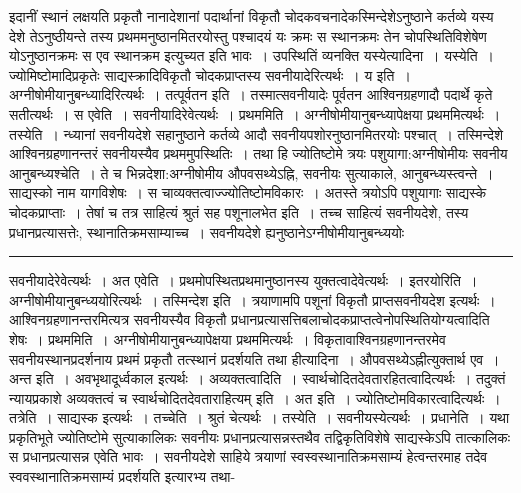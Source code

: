 \documentclass[11pt, openany]{book}
\begin{document}
 इदानीं स्थानं लक्षयति प्रकृतौ नानादेशानां पदार्थानां विकृतौ चोदकवचनादेकस्मिन्देशेऽनुष्ठाने कर्तव्ये यस्य देशे तेऽनुष्ठीयन्ते तस्य प्रथममनुष्ठानमितरयोस्तु पश्चादयं यः क्रमः स स्थानक्रमः तेन चोपस्थितिविशेषेण योऽनुष्ठानक्रमः स एव स्थानक्रम इत्युच्यत इति भावः~। उपस्थितिं व्यनक्ति {\br यस्येत्यादिना~। यस्येति~।} ज्योमिष्टोमादिप्रकृतेः साद्यस्क्रादिविकृतौ चोदकप्राप्तस्य सवनीयादेरित्यर्थः~। {\br य इति~।} अग्नीषोमीयानुबन्ध्यादिरित्यर्थः~। {\br तत्पूर्वतन इति~।} तस्मात्सवनीयादेः पूर्वतन आश्विनग्रहणादौ पदार्थे कृते सतीत्यर्थः~। {\br स एवेति~।} सवनीयादिरेवेत्यर्थः~। {\br प्रथममिति~।} अग्नीषोमीयानुबन्ध्यापेक्षया प्रथममित्यर्थः~। {\br तस्येति~।}
\newpage
\fancyhead[RE]{[ स्थान}
{\bl\noindent न्ध्यानां सवनीयदेशे सहानुष्ठाने कर्तव्ये आदौ सवनीयपशोरनुष्ठानमितरयोः पश्चात्~। तस्मिन्देशे आश्विनग्रहणानन्तरं सवनीयस्यैव प्रथममुपस्थितिः~। तथा
हि ज्योतिष्टोमे त्रयः पशुयागा:अग्नीषोमीयः सवनीय आनुबन्ध्यश्चेति~। ते च भिन्नदेशा:अग्नीषोमीय औपवसथ्येऽह्नि, सवनीयः सुत्याकाले, आनुबन्ध्यस्त्वन्ते~। साद्यस्को नाम याग\footnotemarkA[1]विशेषः~। स चाव्यक्तत्वाज्ज्योतिष्टोमविकारः~। अतस्ते त्रयोऽपि पशुयागाः साद्यस्के चोदकप्राप्ताः~। तेषां च तत्र साहित्यं श्रुतं {\qtl सह पशूनालभेत} इति~। तच्च साहित्यं सवनीयदेशे, तस्य प्रधानप्रत्यासत्तेः, स्थानातिक्रमसाम्याच्च~। सवनीयदेशे ह्यनुष्ठानेऽग्नीषोमीयानुबन्ध्ययोः \\}
\hrule
\vspace{3mm}
\noindent
सवनीयादेरेवेत्यर्थः~। {\br अत एवेति~।} प्रथमोपस्थितप्रथमानुष्ठानस्य युक्तत्वादेवेत्यर्थः~। {\br इतरयोरिति~।} अग्नीषोमीयानुबन्ध्ययोरित्यर्थः~। {\br तस्मिन्देश इति~।} त्रयाणामपि पशूनां विकृतौ प्राप्तसवनीयदेश इत्यर्थः~। आश्विनग्रहणानन्तरमित्यत्र सवनीयस्यैव विकृतौ प्रधानप्रत्यासत्तिबलाचोदकप्राप्तत्वेनोपस्थितियोग्यत्वादिति शेषः~।
{\br प्रथममिति~।} अग्नीषोमीयानुबन्ध्यापेक्षया प्रथममित्यर्थः~। विकृतावाश्विनग्रहणानन्तरमेव सवनीयस्थानप्रदर्शनाय प्रथमं प्रकृतौ तत्स्थानं प्रदर्शयति {\br तथा हीत्यादिना~।} औपवसथ्येऽह्नीत्युक्तार्थ एव~। {\br अन्त इति~।} अवभृथादूर्ध्वकाल इत्यर्थः~। {\br अव्यक्तत्वादिति~।} स्वार्थचोदितदेवतारहितत्वादित्यर्थः~। तदुक्तं न्यायप्रकाशे {\qt अव्यक्तत्वं च स्वार्थचोदितदेवताराहित्यम्} इति~। {\br अत इति~।} ज्योतिष्टोमविकारत्वादित्यर्थः~। {\br तत्रेति~।} साद्यस्क इत्यर्थः~। {\br तच्चेति~।}  श्रुतं चेत्यर्थः~। तस्येति~। सवनीयस्येत्यर्थः~। {\br प्रधानेति~।} यथा प्रकृतिभूते ज्योतिष्टोमे सुत्याकालिकः सवनीयः प्रधानप्रत्यासन्नस्तथैव तद्विकृतिविशेषे साद्यस्केऽपि तात्कालिकः स प्रधानप्रत्यासन्न एवेति भावः~। सवनीयदेशे साहिये त्रयाणां स्वस्वस्थानातिक्रमसाम्यं हेत्वन्तरमाह तदेव स्ववस्थानातिक्रमसाम्यं प्रदर्शयति इत्यारभ्य {\br तथा- }
\end{document}

